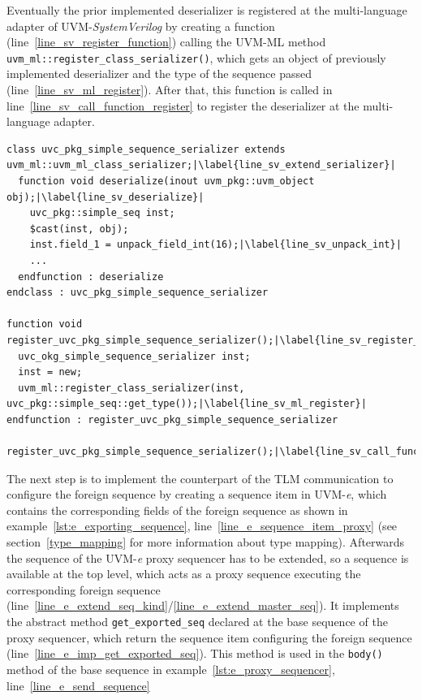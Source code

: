 Eventually the prior implemented deserializer is registered at the multi-language adapter of UVM-\emph{SystemVerilog} by creating a function (line~\ref{line_sv_register_function}) calling the UVM-ML method \lstinline$uvm_ml::register_class_serializer()$, which gets an object of previously implemented deserializer and the type of the sequence passed (line~\ref{line_sv_ml_register}). After that, this function is called in line~\ref{line_sv_call_function_register} to register the deserializer at the multi-language adapter.
\lstset{language=SystemVerilog, numbers = left, escapechar=|, breaklines=true}
\begin{lstlisting}[frame=htrbl, caption={SystemVerilog: deserializer for sequencer proxy},
label={lst:SV_deserializer_sequence}]
class uvc_pkg_simple_sequence_serializer extends uvm_ml::uvm_ml_class_serializer;|\label{line_sv_extend_serializer}|
  function void deserialize(inout uvm_pkg::uvm_object obj);|\label{line_sv_deserialize}|
    uvc_pkg::simple_seq inst;
    $cast(inst, obj);
    inst.field_1 = unpack_field_int(16);|\label{line_sv_unpack_int}|
    ...
  endfunction : deserialize
endclass : uvc_pkg_simple_sequence_serializer

function void register_uvc_pkg_simple_sequence_serializer();|\label{line_sv_register_function}|
  uvc_okg_simple_sequence_serializer inst;
  inst = new;
  uvm_ml::register_class_serializer(inst, uvc_pkg::simple_seq::get_type());|\label{line_sv_ml_register}|
endfunction : register_uvc_pkg_simple_sequence_serializer

register_uvc_pkg_simple_sequence_serializer();|\label{line_sv_call_function_register}|
\end{lstlisting}
The next step is to implement the counterpart of the TLM communication to configure the foreign sequence by creating a sequence item in UVM-\textit{e}, which contains the corresponding fields of the foreign sequence as shown in example~\ref{lst:e_exporting_sequence}, line~\ref{line_e_sequence_item_proxy} (see section~\ref{type_mapping} for more information about type mapping). Afterwards the sequence of the UVM-\textit{e} proxy sequencer has to be extended, so a sequence is available at the top level, which acts as a proxy sequence executing the corresponding foreign sequence (line~\ref{line_e_extend_seq_kind}/\ref{line_e_extend_master_seq}). It implements the abstract method \lstinline$get_exported_seq$ declared at the base sequence of the proxy sequencer, which return the sequence item configuring the foreign sequence (line~\ref{line_e_imp_get_exported_seq}). This method is used in the \lstinline$body()$ method of the base sequence in example~\ref{lst:e_proxy_sequencer}, line~\ref{line_e_send_sequence}\\
